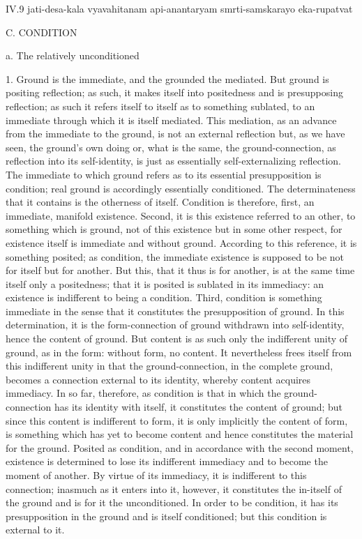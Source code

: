 IV.9
jati-desa-kala vyavahitanam api-anantaryam smrti-samskarayo eka-rupatvat

C. CONDITION

a. The relatively unconditioned

1. Ground is the immediate,
and the grounded the mediated.
But ground is positing reflection;
as such, it makes itself into positedness
and is presupposing reflection;
as such it refers itself to itself
as to something sublated,
to an immediate through which
it is itself mediated.
This mediation, as an advance
from the immediate to the ground,
is not an external reflection
but, as we have seen, the ground's own doing
or, what is the same, the ground-connection,
as reflection into its self-identity,
is just as essentially self-externalizing reflection.
The immediate to which ground refers as
to its essential presupposition is condition;
real ground is accordingly essentially conditioned.
The determinateness that it contains is
the otherness of itself.
Condition is therefore,
first, an immediate, manifold existence.
Second, it is this existence referred to an other,
to something which is ground,
not of this existence but in some other respect,
for existence itself is immediate and without ground.
According to this reference, it is something posited;
as condition, the immediate existence is supposed to be
not for itself but for another.
But this, that it thus is for another, is at the same time
itself only a positedness;
that it is posited is sublated in its immediacy:
an existence is indifferent to being a condition.
Third, condition is something immediate in the sense
that it constitutes the presupposition of ground.
In this determination, it is the form-connection of ground
withdrawn into self-identity, hence the content of ground.
But content is as such only the indifferent unity of ground,
as in the form: without form, no content.
It nevertheless frees itself
from this indifferent unity
in that the ground-connection,
in the complete ground,
becomes a connection external to its identity,
whereby content acquires immediacy.
In so far, therefore, as condition is
that in which the ground-connection has
its identity with itself,
it constitutes the content of ground;
but since this content is indifferent to form,
it is only implicitly the content of form,
is something which has yet to become content
and hence constitutes the material for the ground.
Posited as condition,
and in accordance with the second moment,
existence is determined to lose its indifferent immediacy
and to become the moment of another.
By virtue of its immediacy, it is indifferent to this connection;
inasmuch as it enters into it, however,
it constitutes the in-itself of the ground
and is for it the unconditioned.
In order to be condition,
it has its presupposition in the ground
and is itself conditioned;
but this condition is external to it.

